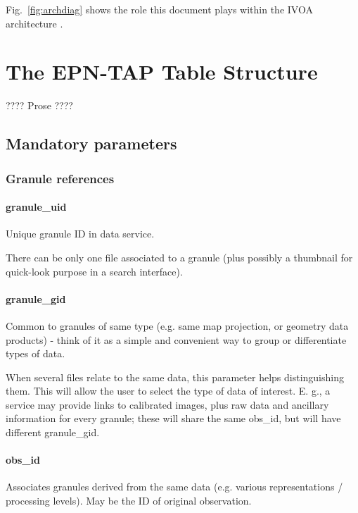 \documentclass[11pt,a4paper]{ivoa}
\begin{document}
Fig.~\ref{fig:archdiag} shows the role this document plays within the
IVOA architecture \citep{note:VOARCH}.

\section{The EPN-TAP Table Structure}

???? Prose ????

\subsection{Mandatory parameters}

\subsubsection{Granule references}

\paragraph{granule\_uid}

Unique granule ID in data service.

There can be only one file associated to a granule (plus possibly a thumbnail for quick-look purpose in a search interface).

\paragraph{granule\_gid}

Common to granules of same type (e.g. same map projection, or geometry data products) - think of it as a simple and convenient way to group or differentiate types of data.

When several files relate to the same data, this parameter helps distinguishing them. This will allow the user to select the type of data of interest. E. g., a service may provide links to calibrated images, plus raw data and ancillary information for every granule; these will share the same obs\_id, but will have different granule\_gid.

\paragraph{obs\_id}

Associates granules derived from the same data (e.g. various representations / processing levels). May be the ID of original observation.
\end{document}

